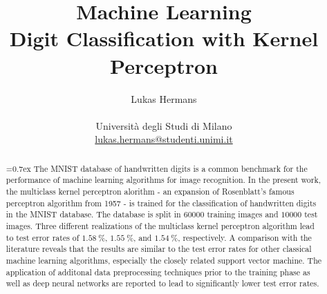 \title{\large Machine Learning \\ \LARGE
 Digit Classification with Kernel Perceptron}
\author{Lukas Hermans\\ \\
{Università degli Studi di Milano} \\
\href{mailto:lukas.hermans@studenti.unimi.it}
{lukas.hermans@studenti.unimi.it}}

\maketitle

\begin{abstract} 
\noindent
{}\font=0.7ex%
The MNIST database of handwritten digits is a common benchmark for the performance of machine learning algorithms for image recognition. In the present work, the multiclass kernel perceptron alorithm - an expansion of Rosenblatt's famous perceptron algorithm from 1957 - is trained for the classification of handwritten digits in the MNIST database. The database is split in $60000$ training images and $10000$ test images. Three different realizations of the multiclass kernel perceptron algorithm lead to test error rates of $\SI{1.58}{\percent}$, $\SI{1.55}{\percent}$, and $\SI{1.54}{\percent}$, respectively. A comparison with the literature reveals that the results are similar to the test error rates for other classical machine learning algorithms, especially the closely related support vector machine. The application of additonal data preprocessing techniques prior to the training phase as well as deep neural networks are reported to lead to significantly lower test error rates. 
\end{abstract}
